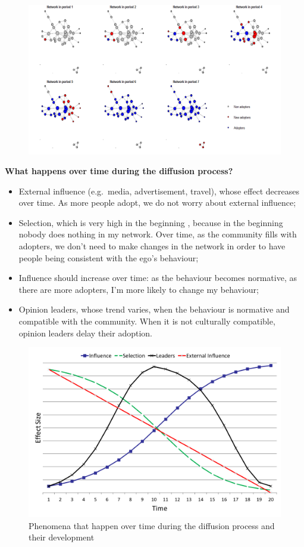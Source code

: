 \documentclass[
  notitlepage,
  onecolumn,
  openany]{book}
\providecommand{\tightlist}{%
  \setlength{\itemsep}{0pt}\setlength{\parskip}{0pt}}
\begin{document}
\begin{figure}[h!]

{\centering \includegraphics[width=0.6\linewidth]{images/14-Christakis and Valente/Untitled 5} 

}

\end{figure}

\textbf{What happens over time during the diffusion process?}

\begin{itemize}
\tightlist
\item
  External influence (e.g.~media, advertisement, travel), whose effect decreases over time. As more people adopt, we do not worry about external influence;
\item
  Selection, which is very high in the beginning , because in the beginning nobody does nothing in my network. Over time, as the community fills with adopters, we don't need to make changes in the network in order to have people being consistent with the ego's behaviour;
\item
  Influence should increase over time: as the behaviour becomes normative, as there are more adopters, I'm more likely to change my behaviour;
\item
  Opinion leaders, whose trend varies, when the behaviour is normative and compatible with the community. When it is not culturally compatible, opinion leaders delay their adoption.
\end{itemize}

\begin{figure}[h!]

{\centering \includegraphics[width=0.5\linewidth]{images/14-Christakis and Valente/Untitled 6} 

}

\caption{Phenomena that happen over time during the diffusion process and their development}\label{fig:unnamed-chunk-106}
\end{figure}
\end{document}
